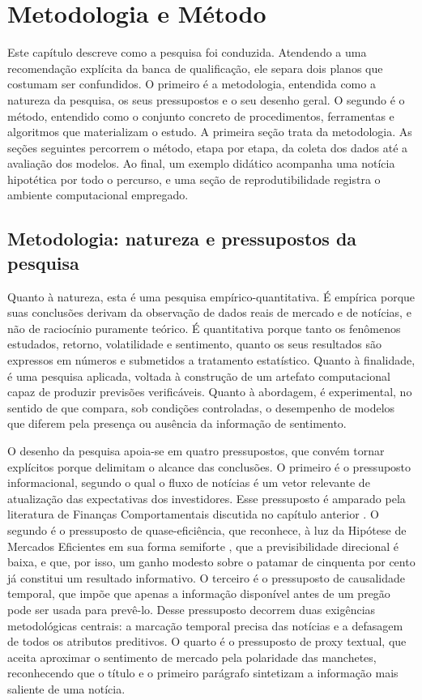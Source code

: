 \chapter{Metodologia e Método} \label{chap:metodologia}

Este capítulo descreve como a pesquisa foi conduzida. Atendendo a uma recomendação explícita da banca de qualificação, ele separa dois planos que costumam ser confundidos. O primeiro é a metodologia, entendida como a natureza da pesquisa, os seus pressupostos e o seu desenho geral. O segundo é o método, entendido como o conjunto concreto de procedimentos, ferramentas e algoritmos que materializam o estudo. A primeira seção trata da metodologia. As seções seguintes percorrem o método, etapa por etapa, da coleta dos dados até a avaliação dos modelos. Ao final, um exemplo didático acompanha uma notícia hipotética por todo o percurso, e uma seção de reprodutibilidade registra o ambiente computacional empregado.

\section{Metodologia: natureza e pressupostos da pesquisa}

Quanto à natureza, esta é uma pesquisa empírico-quantitativa. É empírica porque suas conclusões derivam da observação de dados reais de mercado e de notícias, e não de raciocínio puramente teórico. É quantitativa porque tanto os fenômenos estudados, retorno, volatilidade e sentimento, quanto os seus resultados são expressos em números e submetidos a tratamento estatístico. Quanto à finalidade, é uma pesquisa aplicada, voltada à construção de um artefato computacional capaz de produzir previsões verificáveis. Quanto à abordagem, é experimental, no sentido de que compara, sob condições controladas, o desempenho de modelos que diferem pela presença ou ausência da informação de sentimento.

O desenho da pesquisa apoia-se em quatro pressupostos, que convém tornar explícitos porque delimitam o alcance das conclusões. O primeiro é o pressuposto informacional, segundo o qual o fluxo de notícias é um vetor relevante de atualização das expectativas dos investidores. Esse pressuposto é amparado pela literatura de Finanças Comportamentais discutida no capítulo anterior \cite{tetlock_giving_2007, silva_o_2018}. O segundo é o pressuposto de quase-eficiência, que reconhece, à luz da Hipótese de Mercados Eficientes em sua forma semiforte \cite{fama_efficient_1970, malkiel_efficient_2003}, que a previsibilidade direcional é baixa, e que, por isso, um ganho modesto sobre o patamar de cinquenta por cento já constitui um resultado informativo. O terceiro é o pressuposto de causalidade temporal, que impõe que apenas a informação disponível antes de um pregão pode ser usada para prevê-lo. Desse pressuposto decorrem duas exigências metodológicas centrais: a marcação temporal precisa das notícias e a defasagem de todos os atributos preditivos. O quarto é o pressuposto de proxy textual, que aceita aproximar o sentimento de mercado pela polaridade das manchetes, reconhecendo que o título e o primeiro parágrafo sintetizam a informação mais saliente de uma notícia.

